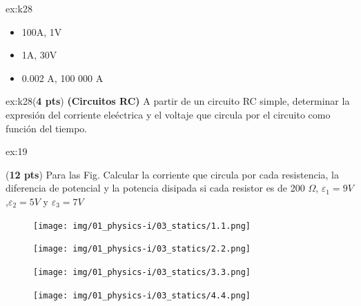 \begin{multicols}{2}
\begin{excercise}[][][]{ex:k28}
{\begin{itemize}
\begin{itemize}
                                    \item 100A, 1V
                                    \item 1A, 30V
                                    \item 0.002 A, 100 000 A
                                \end{itemize}
        \end{itemize}
         }
    \end{excercise}
        \begin{excercise}[][][]{ex:k28}{(\textbf{4 pts})
        \textbf{(Circuitos RC)}
            A partir de un circuito RC simple, determinar la expresión del corriente eleéctrica y el voltaje que circula por el circuito como función del tiempo.
             \vspace{8cm}
         }
    \end{excercise}
   
    \begin{excercise}[][][]{ex:19}{(\textbf{12 pts})
       Para las Fig. Calcular la corriente que circula por cada resistencia, la diferencia de potencial y la potencia disipada si cada resistor es de 200 $\Omega$, $\varepsilon_1=9V$,$\varepsilon_2=5V$ y $\varepsilon_3=7V$ 
        \begin{figure}[H]
            \centering
            \texttt{[image: img/01\_physics-i/03\_statics/1.1.png]}
        \end{figure}
         \begin{figure}[H]
            \centering
            \texttt{[image: img/01\_physics-i/03\_statics/2.2.png]}
        \end{figure} 
    } 
          \begin{figure}[H]
            \centering
            \texttt{[image: img/01\_physics-i/03\_statics/3.3.png]}
        \end{figure}
         \begin{figure}[H]
            \centering
            \texttt{[image: img/01\_physics-i/03\_statics/4.4.png]}
        \end{figure}
    \end{excercise}
\end{multicols}
